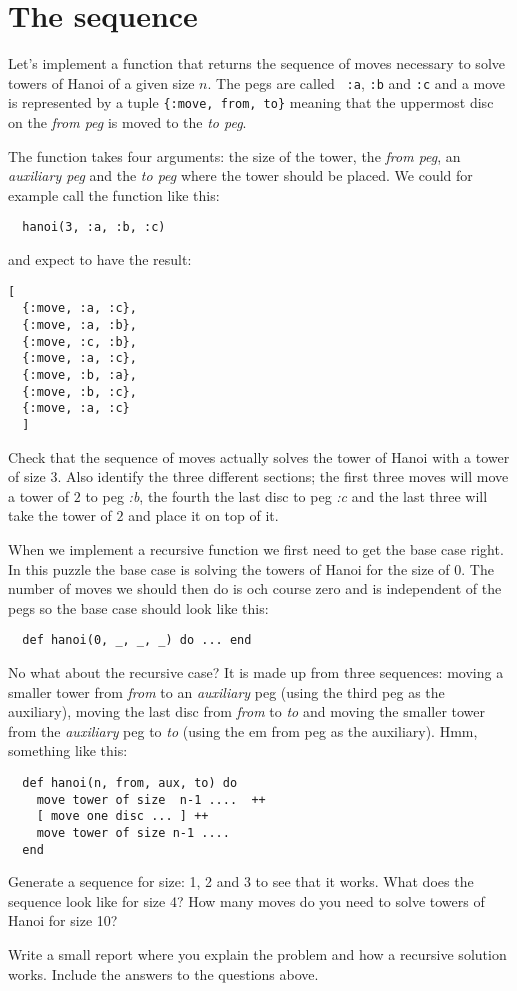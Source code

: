 \documentclass[a4paper,11pt]{article}
\begin{document}
\section*{The sequence}

Let's implement a function that returns the sequence of moves necessary
to solve towers of Hanoi of a given size $n$. The pegs are called {\tt
  :a}, {\tt :b} and {\tt :c} and a move is represented by a tuple
{\tt \{:move, from, to\}} meaning that the uppermost disc on the {\em from
  peg} is moved to the {\em to peg}.

The function takes four arguments: the size of the tower, the {\em
  from peg}, an {\em auxiliary peg} and the {\em to peg} where the
tower should be placed. We could for example call the function like this:

\begin{verbatim}
  hanoi(3, :a, :b, :c)
\end{verbatim}

and expect to have the result:

\begin{verbatim}
[
  {:move, :a, :c},
  {:move, :a, :b},
  {:move, :c, :b},
  {:move, :a, :c},
  {:move, :b, :a},
  {:move, :b, :c},
  {:move, :a, :c}
  ]
\end{verbatim}

Check that the sequence of moves actually solves the tower of Hanoi
with a tower of size 3. Also identify the three different sections; the
first three moves will move a tower of $2$ to peg {\em :b}, the fourth
the last disc to peg {\em :c} and the last three will take the tower
of $2$ and place it on top of it.

When we implement a recursive function we first need to get the base
case right. In this puzzle the base case is solving the towers of
Hanoi for the size of $0$. The number of moves we should then do is
och course zero and is independent of the pegs so the base case should
look like this:

\begin{verbatim}
  def hanoi(0, _, _, _) do ... end
\end{verbatim}

No what about the recursive case? It is made up from three sequences:
moving a smaller tower from {\em from} to an {\em auxiliary} peg
(using the third peg as the auxiliary), moving the last disc from {\em
  from } to {\em to} and moving the smaller tower from the {\em
  auxiliary} peg to {\em to} (using the {em from} peg as the
auxiliary). Hmm, something like this:


\begin{verbatim}
  def hanoi(n, from, aux, to) do
    move tower of size  n-1 ....  ++ 
    [ move one disc ... ] ++ 
    move tower of size n-1 ....
  end
\end{verbatim}

Generate a sequence for size: 1, 2 and 3 to see that it works. What
does the sequence look like for size 4?  How many moves do you need to
solve towers of Hanoi for size 10? 

Write a small report where you explain the problem and how a recursive
solution works. Include the answers to the questions above.
\end{document}
